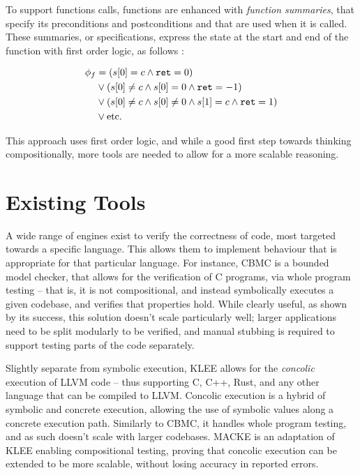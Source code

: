 To support functions calls, functions are enhanced with \emph{function summaries}, that specify its preconditions and postconditions and that are used when it is called. These summaries, or specifications, express the state at the start and end of the function with first order logic, as follows \cite{compositionalsymtesting}:

\begin{align*}
	\phi_f 
		&= (s[0]=c\land \texttt{ret}=0) \\
		&\lor (s[0]\neq c\land s[0]=0 \land \texttt{ret}=-1) \\
		&\lor (s[0]\neq c\land s[0]\neq 0\land s[1]=c \land \texttt{ret}=1) \\
		&\lor \text{etc.} 
\end{align*}

This approach uses first order logic, and while a good first step towards thinking compositionally, more tools are needed to allow for a more scalable reasoning.

\section{Existing Tools}

A wide range of engines exist to verify the correctness of code, most targeted towards a specific language. This allows them to implement behaviour that is appropriate for that particular language. 
For instance, CBMC \cite{cbmc} is a bounded model checker, that allows for the verification of C programs, via whole program testing -- that is, it is not compositional, and instead symbolically executes a given codebase, and verifies that properties hold. While clearly useful, as shown by its success, this solution doesn't scale particularly well; larger applications need to be split modularly to be verified, and manual stubbing is required to support testing parts of the code separately.

Slightly separate from symbolic execution, KLEE \cite{klee} allows for the \emph{concolic} execution of LLVM code -- thus supporting C, C++, Rust, and any other language that can be compiled to LLVM. Concolic execution is a hybrid of symbolic and concrete execution, allowing the use of symbolic values along a concrete execution path. Similarly to CBMC, it handles whole program testing, and as such doesn't scale with larger codebases. MACKE \cite{macke} is an adaptation of KLEE enabling compositional testing, proving that concolic execution can be extended to be more scalable, without losing accuracy in reported errors.

